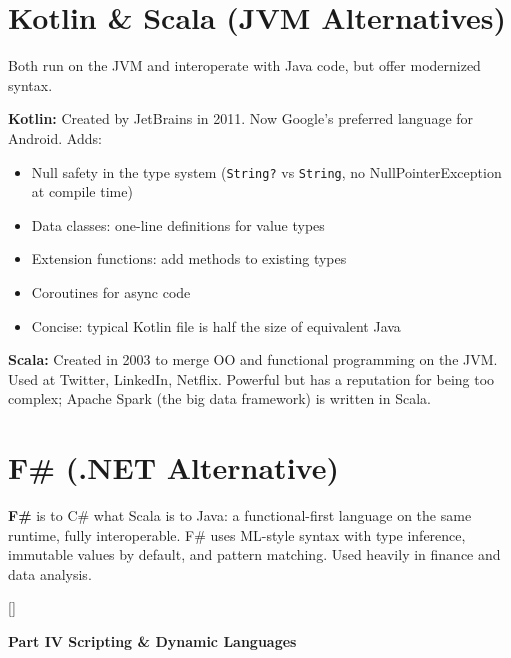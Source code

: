 \documentclass[11pt, letterpaper]{article}
\newcommand{\greensections}{%
  \titleformat{\section}{\large\bfseries\color{sectiongreen}}{}{0em}{}[\color{sectiongreen}\titlerule]%
  \titleformat{\subsection}{\normalsize\bfseries\color{sectiongreen!80!black}}{}{0em}{}%
}
\newcommand{\partbanner}[3]{%
  \begin{tcolorbox}[colback=#1, colframe=#2, boxrule=1.2pt, arc=4pt,
    left=8pt, right=8pt, top=6pt, bottom=6pt]
    \begin{center}{\LARGE\bfseries #3}\end{center}
  \end{tcolorbox}%
}
\begin{document}
\section*{Kotlin \& Scala (JVM Alternatives)}

Both run on the JVM and interoperate with Java code, but offer modernized syntax.

\textbf{Kotlin:} Created by JetBrains in 2011. Now Google's preferred language for Android. Adds:
\begin{itemize}[noitemsep]
  \item Null safety in the type system (\texttt{String?} vs \texttt{String}, no NullPointerException at compile time)
  \item Data classes: one-line definitions for value types
  \item Extension functions: add methods to existing types
  \item Coroutines for async code
  \item Concise: typical Kotlin file is half the size of equivalent Java
\end{itemize}

\textbf{Scala:} Created in 2003 to merge OO and functional programming on the JVM. Used at Twitter, LinkedIn, Netflix. Powerful but has a reputation for being too complex; Apache Spark (the big data framework) is written in Scala.

\section*{F\# (.NET Alternative)}

\textbf{F\#} is to C\# what Scala is to Java: a functional-first language on the same runtime, fully interoperable. F\# uses ML-style syntax with type inference, immutable values by default, and pattern matching. Used heavily in finance and data analysis.

\newpage

\greensections
{}
\partbanner{part2bg}{sectiongreen}{Part IV \quad Scripting \& Dynamic Languages}
\end{document}
